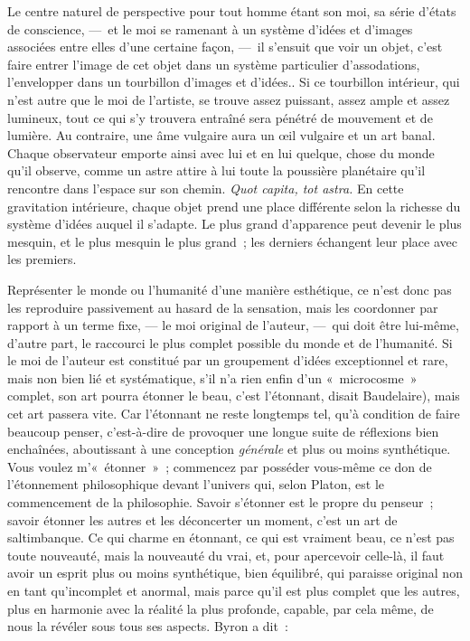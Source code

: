 \documentclass[french,twoside]{book} %
\begin{document}
Le centre naturel de perspective pour tout homme étant son moi, sa série d’états de conscience, — et le moi se ramenant à un système d’idées et d’images associées entre elles d’une certaine façon, — il s’ensuit que voir un objet, c’est faire entrer l’image de cet objet dans un système particulier d’assodations, l’envelopper dans un tourbillon d’images et d’idées.. Si ce tourbillon intérieur, qui n’est autre que le moi de l’artiste, se trouve assez puissant, assez ample et assez lumineux, tout ce qui s’y trouvera entraîné sera pénétré de mouvement et de lumière. Au contraire, une âme vulgaire aura un œil vulgaire et un art banal. Chaque observateur emporte ainsi avec lui et en lui quelque, chose du monde qu’il observe, comme un astre attire à lui toute la poussière planétaire qu’il rencontre dans l’espace sur son chemin. \emph{Quot capita, tot astra.} En cette gravitation intérieure, chaque objet prend une place différente selon la richesse du système d’idées auquel il s’adapte. Le plus grand d’apparence peut devenir le plus mesquin, et le plus mesquin le plus grand ; les derniers échangent leur place avec les premiers.\par
Représenter le monde ou l’humanité d’une manière esthétique, ce n’est donc pas les reproduire passivement au hasard de la sensation, mais les coordonner par rapport à un terme fixe, — le moi original de l’auteur, — qui doit être lui-même, d’autre part, le raccourci le plus complet possible du monde et de l’humanité. Si le moi de l’auteur est constitué par un groupement d’idées exceptionnel et rare, mais non bien lié et systématique, s’il n’a rien enfin d’un « microcosme » complet, son art pourra étonner le beau, c’est l’étonnant, disait Baudelaire), mais cet art passera vite. Car l’étonnant ne reste longtemps tel, qu’à condition de faire beaucoup penser, c’est-à-dire de provoquer une longue suite de réflexions bien enchaînées, aboutissant à une conception \emph{générale} et plus ou moins synthétique. Vous voulez m’« étonner » ; commencez par posséder vous-même ce don de l’étonnement philosophique devant l’univers qui, selon Platon, est le commencement de la philosophie. Savoir s’étonner est le propre du penseur ; savoir étonner les autres et les déconcerter un moment, c’est un art de saltimbanque. Ce qui charme en étonnant, ce qui est vraiment beau, ce n’est pas toute nouveauté, mais la nouveauté du vrai, et, pour apercevoir celle-là, il faut avoir un esprit plus ou moins synthétique, bien équilibré, qui paraisse original non en tant qu’incomplet et anormal, mais parce qu’il est plus complet que les autres, plus en harmonie avec la réalité la plus profonde, capable, par cela même, de nous la révéler sous tous ses aspects. Byron a dit :\par
\end{document}
